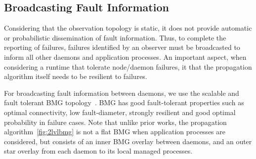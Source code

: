 \documentclass[sigconf]{acmart}
\begin{document}

\subsection{Broadcasting Fault Information}
Considering that the observation topology is static, it does not provide 
automatic or probabilistic dissemination of fault information. Thus, to complete 
the reporting of failures, failures identified by an observer must be broadcasted
to inform all other daemons and application processes. An important aspect,
when considering a runtime that tolerate node/daemon failures, it that the 
propagation algorithm itself needs to be resilient to failures. 

For broadcasting fault information between daemons, we use the scalable and fault 
tolerant BMG topology~\cite{Angskun07}. BMG has good fault-tolerant properties such 
as optimal connectivity, low fault-diameter, strongly resilient and good optimal 
probability in failure cases. Note that unlike prior works, the propagation 
algorithm~\ref{fig:2lvlbmg} is not a flat BMG when application processes are considered, but consists of an 
inner BMG overlay between daemons, and an outer star overlay from each daemon to its 
local managed processes.
\end{document}
